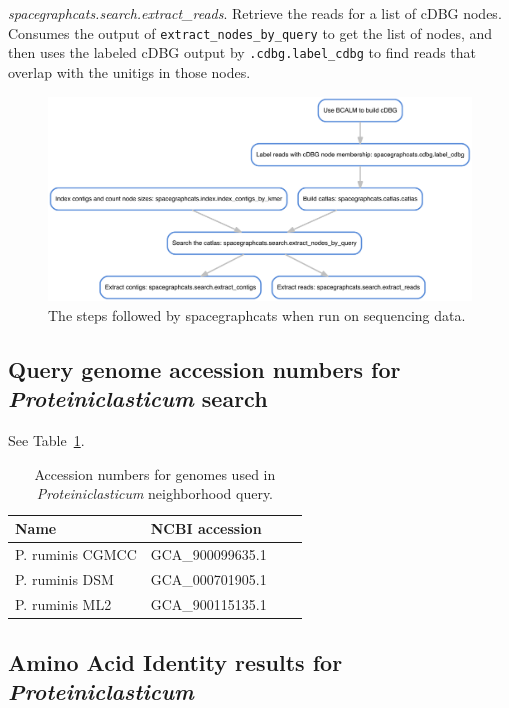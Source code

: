 \emph{spacegraphcats.search.extract\_reads}. Retrieve the reads for a list of cDBG 
nodes.  Consumes the output of {\tt extract\_nodes\_by\_query} to get the list of 
nodes, and then uses the labeled cDBG output by {\tt .cdbg.label\_cdbg} to 
find reads that overlap with the unitigs in those nodes.
  

\begin{figure}
 \centering
 \includegraphics[width=\linewidth]{figures/sgc_dag}
	\caption{The steps followed by \textsf{spacegraphcats} when run
on sequencing data.
}
 \label{fig:sgc_dag}
\end{figure}

\subsection{Query genome accession numbers for {\em Proteiniclasticum} search}
\label{subsec:query_accessions}

See Table~\ref{tab:query_accessions}.

\begin{table}[b]
  \begin{tabular}{l l c c }
    \toprule
    Name & NCBI accession \\
    \midrule
    \hline
    P. ruminis CGMCC & GCA\_900099635.1 \\
    P. ruminis DSM & GCA\_000701905.1 \\
    P. ruminis ML2 & GCA\_900115135.1 \\
    \hline
    \bottomrule
  \end{tabular}
  \caption{Accession numbers for genomes used in {\em Proteiniclasticum} neighborhood query.}
  \label{tab:query_accessions}
\end{table}

\subsection{Amino Acid Identity results for {\em Proteiniclasticum}}
\label{subsec:aai}


